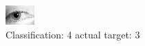 \begin{figure}[h!]
\begin{center}
\includegraphics[width=0.60\columnwidth]{figures/ID1339_class_4_target_3.png}
\end{center}
\caption{ Classification: 4 actual target: 3}
\label{fig:ID1339_class_4_target_3}
\end{figure}
